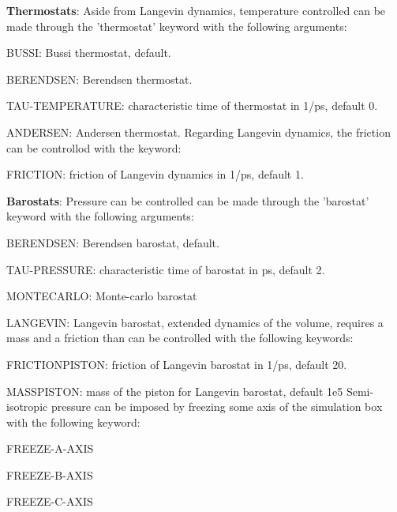 {\bfseries Thermostats}\-: Aside from Langevin dynamics, temperature controlled can be made through the 'thermostat' keyword with the following arguments\-:
\begin{DoxyItemize}
\item B\-U\-S\-S\-I\-: Bussi thermostat, default.
\item B\-E\-R\-E\-N\-D\-S\-E\-N\-: Berendsen thermostat.
\item T\-A\-U-\/\-T\-E\-M\-P\-E\-R\-A\-T\-U\-R\-E\-: characteristic time of thermostat in 1/ps, default 0.
\item A\-N\-D\-E\-R\-S\-E\-N\-: Andersen thermostat. Regarding Langevin dynamics, the friction can be controllod with the keyword\-:
\item F\-R\-I\-C\-T\-I\-O\-N\-: friction of Langevin dynamics in 1/ps, default 1.
\end{DoxyItemize}

{\bfseries Barostats}\-: Pressure can be controlled can be made through the 'barostat' keyword with the following arguments\-:
\begin{DoxyItemize}
\item B\-E\-R\-E\-N\-D\-S\-E\-N\-: Berendsen barostat, default.
\item T\-A\-U-\/\-P\-R\-E\-S\-S\-U\-R\-E\-: characteristic time of barostat in ps, default 2.
\item M\-O\-N\-T\-E\-C\-A\-R\-L\-O\-: Monte-\/carlo barostat
\item L\-A\-N\-G\-E\-V\-I\-N\-: Langevin barostat, extended dynamics of the volume, requires a mass and a friction than can be controlled with the following keywords\-:
\begin{DoxyItemize}
\item F\-R\-I\-C\-T\-I\-O\-N\-P\-I\-S\-T\-O\-N\-: friction of Langevin barostat in 1/ps, default 20.
\item M\-A\-S\-S\-P\-I\-S\-T\-O\-N\-: mass of the piston for Langevin barostat, default 1e5 Semi-\/isotropic pressure can be imposed by freezing some axis of the simulation box with the following keyword\-:
\end{DoxyItemize}
\item F\-R\-E\-E\-Z\-E-\/\-A-\/\-A\-X\-I\-S
\item F\-R\-E\-E\-Z\-E-\/\-B-\/\-A\-X\-I\-S
\item F\-R\-E\-E\-Z\-E-\/\-C-\/\-A\-X\-I\-S
\end{DoxyItemize}

